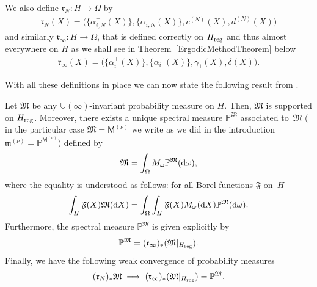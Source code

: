 We also define $\mathfrak{r}_N\colon H \to \Omega$ by
\begin{gather*}
\mathfrak{r}_N(X)=\big(\big\{\alpha_{i,N}^{+}(X)\big\}, \big\{\alpha_{i,N}^{-}(X)\big\}, c^{(N)}(X), d^{(N)}(X)\big)
\end{gather*}
and similarly $\mathfrak{r}_{\infty}\colon H \to \Omega$, that is defined correctly on $H_{{\rm reg}}$ and thus almost everywhere on $H$ as we shall see in Theorem~\ref{ErgodicMethodTheorem} below
\begin{gather*}
\mathfrak{r}_\infty(X)=\big(\big\{\alpha_{i}^{+}(X)\big\}, \big\{\alpha_{i}^{-}(X)\big\}, \gamma_1(X), \delta(X)\big).
\end{gather*}

With all these definitions in place we can now state the following result from \cite[Section 5]{BorodinOlshanskiErgodic}.

\begin{Theorem}\label{ErgodicMethodTheorem}Let $\mathfrak{M}$ be any $\mathbb{U}(\infty)$-invariant probability measure on $H$. Then, $\mathfrak{M}$ is supported on $H_{{\rm reg}}$. Moreover, there exists a unique spectral measure $\mathbb{P}^{\mathfrak{M}}$ associated to~$\mathfrak{M}$ $($in the particular case $\mathfrak{M}=\mathsf{M}^{(\nu)}$ we write as we did in the introduction $\mathfrak{m}^{(\nu)}=\mathbb{P}^{\mathsf{M}^{(\nu)}})$ defined by
\begin{gather*}
\mathfrak{M}=\int_{\Omega}^{}M_{\omega} \mathbb{P}^{\mathfrak{M}}({\rm d}\omega),
\end{gather*}
where the equality is understood as follows: for all Borel functions $\mathfrak{F}$ on~$H$
\begin{gather*}
\int_{H}^{}\mathfrak{F}(X)\mathfrak{M}({\rm d}X)=\int_{\Omega}^{}\int_{H}^{}\mathfrak{F}(X)M_{\omega}({\rm d}X)\mathbb{P}^{\mathfrak{M}}({\rm d}\omega).
\end{gather*}
Furthermore, the spectral measure $\mathbb{P}^{\mathfrak{M}}$ is given explicitly by
\begin{gather*}
\mathbb{P}^{\mathfrak{M}}= (\mathfrak{r}_{\infty} )_* (\mathfrak{M}|_{H_{{\rm reg}}} ).
\end{gather*}
Finally, we have the following weak convergence of probability measures
\begin{gather*}
 (\mathfrak{r}_N )_* \mathfrak{M} \implies (\mathfrak{r}_{\infty} )_* (\mathfrak{M}|_{H_{{\rm reg}}} )=\mathbb{P}^{\mathfrak{M}}.
\end{gather*}
\end{Theorem}


